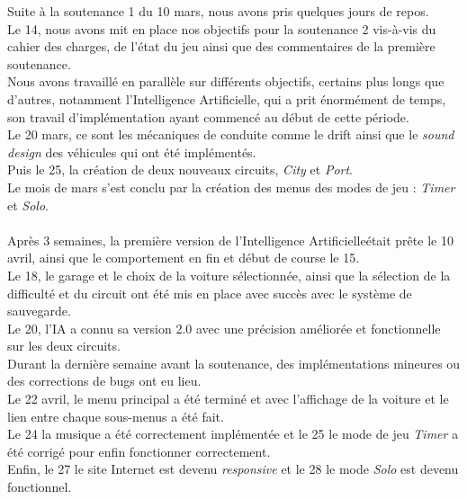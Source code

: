 \documentclass[a4paper,12pt]{article}
\newcommand{\AI}{Intelligence Artificielle}
\begin{document}
            Suite à la soutenance 1 du 10 mars, nous avons pris quelques jours de repos.\\Le 14, nous
            avons mit en place nos objectifs pour la soutenance 2 vis-à-vis du cahier des charges, de
            l'état du jeu ainsi que des commentaires de la première soutenance.\\
            Nous avons travaillé en parallèle sur différents objectifs, certains plus longs que d'autres,
            notamment l'\AI, qui a prit énormément de temps, son travail d'implémentation ayant
            commencé au début de cette période.\\Le 20 mars, ce sont les mécaniques de conduite comme le
            drift ainsi que le \textit{sound design} des véhicules qui ont été implémentés.\\Puis le 25, la
            création de deux nouveaux circuits, \textsl{City} et \textsl{Port}.\\Le mois de mars s'est
            conclu par la création des menus des modes de jeu : \textsl{Timer} et \textsl{Solo}.\\
            \\Après 3 semaines, la première version de l'\AI\;était prête le 10 avril, ainsi que le
            comportement en fin et début de course le 15.\\Le 18, le garage et le choix de la voiture 
            sélectionnée, ainsi que la sélection de la difficulté et du circuit ont été mis en place avec
            succès avec le système de sauvegarde.\\Le 20, l'IA a connu sa version 2.0 avec une précision améliorée et fonctionnelle sur
            les deux circuits.\\
            Durant la dernière semaine avant la soutenance, des implémentations mineures ou des
            corrections de bugs ont eu lieu.\\Le 22 avril, le menu principal a été terminé et avec
            l'affichage de la voiture et le lien entre chaque sous-menus a été fait.\\Le 24 la musique a
            été correctement implémentée et le 25 le mode de jeu \textsl{Timer} a été corrigé pour enfin
            fonctionner correctement.\\Enfin, le 27 le site Internet est devenu \textit{responsive} et le
            28 le mode \textsl{Solo} est devenu fonctionnel.
\end{document}
